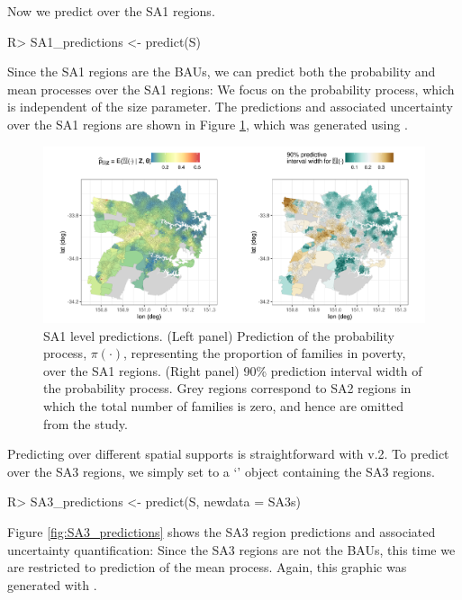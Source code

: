 \documentclass[nojss]{jss}
\newcommand{\class}[1]{`\code{#1}'}
\begin{document}
%

Now we predict over the SA1 regions.
\begin{Code}
R> SA1_predictions <- predict(S)
\end{Code}
Since the SA1 regions are the BAUs, we can predict both the probability and mean processes over the SA1 regions: We focus on the probability process, which is independent of the size parameter. 
The predictions and associated uncertainty over the SA1 regions are shown in Figure \ref{fig:SA1_predictions}, which was generated using .
 \begin{figure}[t!]
    \centering
    \includegraphics[width = \linewidth]{img/Sydney_SA1_predictions.png}
    \caption{SA1 level predictions. (Left panel) Prediction of the probability process, $\pi(\cdot)$, representing the proportion of families in poverty, over the SA1 regions. (Right panel) 90\% prediction interval width of the probability process.
    Grey regions correspond to SA2 regions in which the total number of families is zero, and hence are omitted from the study. 
}   
  \label{fig:SA1_predictions}
\end{figure}


Predicting over different spatial supports is straightforward with  v.2. 
 To predict over the SA3 regions, we simply set  to a  \class{SpatialPolygonsDataFrame} object containing the SA3 regions.
\begin{Code}
R> SA3_predictions <- predict(S, newdata = SA3s)
\end{Code}
Figure \ref{fig:SA3_predictions} shows the SA3 region predictions and associated uncertainty quantification: Since the SA3 regions are not the BAUs, this time we are restricted to prediction of the mean process. Again, this graphic was generated with . 
\end{document}

